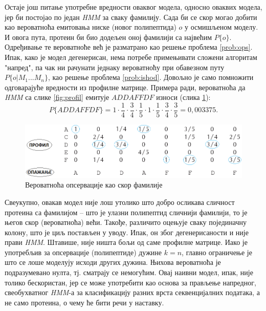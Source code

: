 \documentclass[12pt,oneside]{memoir}
\begin{document}
\begin{CJK}{UTF8}{ipxm}
Остаје још питање употребне вредности оваквог модела, односно оваквих модела, јер би постојао по један \textit{HMM} за сваку фамилију. Сада би се скор могао добити као вероватноћа емитовања ниске (новог полипептида) $o$ у осмишљеном моделу. И овога пута, протеин би био додељен оној фамилији са највећим $P\{o\}$. Одређивање те вероватноће већ је разматрано као решење проблема \ref{prob:ops}. Ипак, како је модел дегенерисан, нема потребе примењивати сложени алгоритам "напред", па чак ни рачунати једнаку вероватноћу при обавезном путу $P\{o | M_1...M_n\}$, као решење проблема \ref{prob:ishod}. Довољно је само помножити одговарајуће вредности из профилне матрице. Примера ради, вероватноћа да \textit{HMM} са слике \ref{fig:profil} емитује $ADDAFFDF$ износи (слика \ref{fig:prof_ishod}): $$P\{ADDAFFDF\} = 1 \cdot \frac{1}{4} \cdot \frac{3}{4} \cdot \frac{1}{5} \cdot 1 \cdot \frac{1}{5} \cdot \frac{3}{4} \cdot \frac{3}{5} = 0,003375.$$

\begin{figure}[H]
  \centering
  \includegraphics[width=\textwidth]{prof_ishod.png}
  \caption{Вероватноћа опсервације као скор фамилије \cite{compeau2015}}
  \label{fig:prof_ishod}
\end{figure}

Свеукупно, овакав модел није лош утолико што добро осликава сличност протеина са фамилијом -- што је улазни полипептид сличнији фамилији, то је његов скор (вероватноћа) већи. Такође, различито оцењује сваку појединачну колону, што је циљ постављен у уводу. Ипак, он због дегенерисаности и није прави \textit{HMM}. Штавише, није ништа бољи од саме профилне матрице. Иако је употребљив за опсервације (полипептиде) дужине $k = n$, главно ограничење је што се лоше моделују исходи других дужина. Њихова вероватноћа је подразумевано нулта, тј. сматрају се немогућим. Овај наивни модел, ипак, није толико бескористан, јер се може употребити као основа за прављење напредног, свеобухватног \textit{HMM}-а за класификацију разних врста секвенцијалних података, а не само протеина, о чему ће бити речи у наставку.


\end{CJK}
\end{document}
